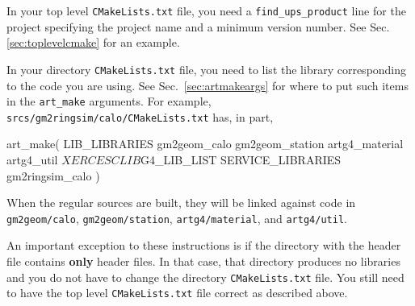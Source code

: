 In your top level \texttt{CMakeLists.txt} file, you need a
\texttt{find\_ups\_product} line for the project specifying the project name
and a minimum version number. See Sec.\ref{sec:toplevelcmake} for an
example.

In your directory \texttt{CMakeLists.txt} file, you need to list the library corresponding to the code
you are using. See Sec.~\ref{sec:artmakeargs} for
where to put such items in the \texttt{art\_make} arguments. For example,\\\noindent 
\texttt{srcs/gm2ringsim/calo/CMakeLists.txt} has, in part,

\begin{cpplisting}
  art_make( 
      LIB_LIBRARIES
          gm2geom_calo
          gm2geom_station
          artg4_material
          artg4_util
          ${XERCESCLIB}
          ${G4_LIB_LIST}
      SERVICE_LIBRARIES
          gm2ringsim_calo
        )
\end{cpplisting}

When the regular sources are built, they will be linked against code in \texttt{gm2geom/calo}, \texttt{gm2geom/station}, \texttt{artg4/material}, and 
\texttt{artg4/util}.

An important exception to these instructions is if the directory with
the header file contains \textbf{only} header files. In that case, that
directory produces no libraries and you do not have to change the
directory \texttt{CMakeLists.txt} file. You still need to have the top
level \texttt{CMakeLists.txt} file correct as described above. 




      